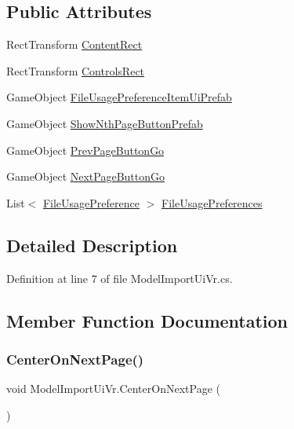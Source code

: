 \subsection*{Public Attributes}
\begin{DoxyCompactItemize}
\item 
Rect\+Transform \mbox{\hyperlink{class_model_import_ui_vr_a43fbbfac9bf58148f3e2a05827824079}{Content\+Rect}}
\item 
Rect\+Transform \mbox{\hyperlink{class_model_import_ui_vr_a2f5d329583de1c44327e65f5ed4ce302}{Controls\+Rect}}
\item 
Game\+Object \mbox{\hyperlink{class_model_import_ui_vr_a379fe882068c6dd8b44320ac64164cf3}{File\+Usage\+Preference\+Item\+Ui\+Prefab}}
\item 
Game\+Object \mbox{\hyperlink{class_model_import_ui_vr_ae7e432d08fdcad54d5b6967373b166f9}{Show\+Nth\+Page\+Button\+Prefab}}
\item 
Game\+Object \mbox{\hyperlink{class_model_import_ui_vr_a0ed1df0840dea3ca857fada817d83474}{Prev\+Page\+Button\+Go}}
\item 
Game\+Object \mbox{\hyperlink{class_model_import_ui_vr_a3e500d9c3c5d5f0d2a4b9dda1e76a4f9}{Next\+Page\+Button\+Go}}
\item 
List$<$ \mbox{\hyperlink{class_file_usage_preference}{File\+Usage\+Preference}} $>$ \mbox{\hyperlink{class_model_import_ui_vr_a993eba8f0736dedb38513206772e011b}{File\+Usage\+Preferences}}
\end{DoxyCompactItemize}


\subsection{Detailed Description}


Definition at line 7 of file Model\+Import\+Ui\+Vr.\+cs.



\subsection{Member Function Documentation}
\mbox{\label{class_model_import_ui_vr_a1a0afbc19ce40ac3365a73716075bcd4}} 
\subsubsection{\texorpdfstring{CenterOnNextPage()}{CenterOnNextPage()}}
{\footnotesize\ttfamily void Model\+Import\+Ui\+Vr.\+Center\+On\+Next\+Page (\begin{DoxyParamCaption}{ }\end{DoxyParamCaption})}



